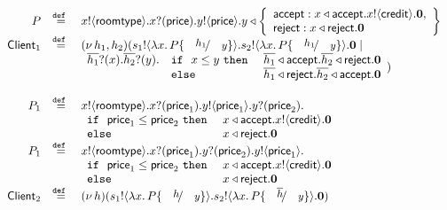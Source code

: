 \newcommand{\rtype}{\mathsf{roomtype}}
\newcommand{\price}{\mathsf{price}}
\newcommand{\accept}{\mathsf{accept}}
\newcommand{\reject}{\mathsf{reject}}
\newcommand{\creditc}{\mathsf{credit}}

\newcommand{\Client}{\mathsf{Client}}

\[
	\begin{array}{rcl}
		P &\defeq& \bout{x}{\rtype} \binp{x}{\price} \bout{y}{\price}
		y \triangleleft \left\{
				\begin{array}{l}
					\accept: \bsel{x}{\accept} \bout{x}{\creditc} \inact,\\
					\reject: \bsel{x}{\reject} \inact
				\end{array}
				\right\}
		\\
		\Client_1 &\defeq& \newsp{h_1, h_2}{\bout{s_1}{\abs{x}{P \subst{h_1}{y}}} \bout{s_2}{\abs{x}{P \subst{h_1}{y}}} \inact \Par\\
			&&
			\begin{array}{lll}
				\binp{\dual{h_1}}{x} \binp{\dual{h_2}}{y} & \If\ x \leq y\ \Then & \bsel{\dual{h_1}}{\accept} \bsel{\dual{h_2}}{\reject} \inact\\
				& \Else& \bsel{\dual{h_1}}{\reject} \bsel{\dual{h_2}}{\accept} \inact
			\end{array}
		}
		\\
		\\
		P_1 &\defeq&	\bout{x}{\rtype} \binp{x}{\price_1} \bout{y}{\price_1} \binp{y}{\price_2}\\
			&&
				\begin{array}{ll}
					\If\ \price_1 \leq \price_2\ \Then & \bsel{x}{\accept} \bout{x}{\creditc} \inact\\
					\Else & \bsel{x}{\reject} \inact
				\end{array}
		\\
		P_1 &\defeq&	\bout{x}{\rtype} \binp{x}{\price_1} \binp{y}{\price_2} \bout{y}{\price_1}\\
			&&
				\begin{array}{ll}
					\If\ \price_1 \leq \price_2\ \Then & \bsel{x}{\accept} \bout{x}{\creditc} \inact\\
					\Else & \bsel{x}{\reject} \inact
				\end{array}
		\\
		\Client_2 &\defeq& \newsp{h}{\bout{s_1}{\abs{x}{P \subst{h}{y}}} \bout{s_2}{\abs{x}{P \subst{\dual{h}}{y}}} \inact}
	\end{array}
\]


